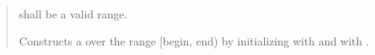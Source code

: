 \documentclass{wg21}
\begin{document}
\begin{quote}
\begin{addedblock}
\begin{itemdescr}
    \expects
     shall be a valid range.

    \effects
    Constructs a  over the range [begin, end) by initializing  with  and  with .

\end{itemdescr}
\end{addedblock}
\end{quote}
\end{document}

